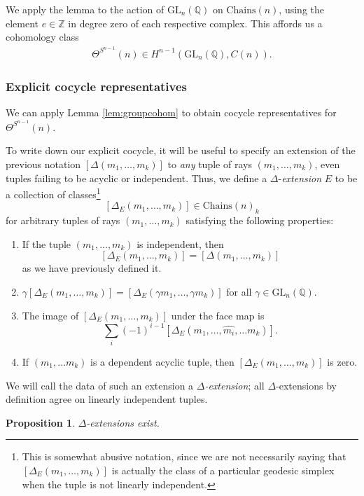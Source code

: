 \documentclass[10pt]{amsart}
\newtheorem{prop}[thm]{Proposition}
\theoremstyle{definition}
\newcommand{\Chains}{\mathrm{Chains}}
\numberwithin{equation}{section}
\begin{document}
    We apply the lemma to the action of $\mathrm{GL}_n(\mathbb{Q})$ on $\Chains(n)$, using the element $e\in \mathbb{Z}$ in degree zero of each respective complex. This affords us a cohomology class
    \begin{align}
    \Theta^{S^{n-1}}(n)\in H^{n-1}(\mathrm{GL}_n(\mathbb{Q}), C(n)).
    \end{align}
    
    \subsubsection{Explicit cocycle representatives}

    We can apply Lemma \ref{lem:groupcohom} to obtain cocycle representatives for $\Theta^{S^{n-1}}(n)$.
    
    To write down our explicit cocycle, it will be useful to specify an extension of the previous notation $[\Delta(m_1,\ldots, m_k)]$ to \emph{any} tuple of rays $(m_1,\ldots, m_k)$, even tuples failing to be acyclic or independent. Thus, we define a $\Delta$-\emph{extension} $E$ to be a collection of classes\footnote{This is somewhat abusive notation, since we are not necessarily saying that $[\Delta_E(m_1,\ldots, m_k)]$ is actually the class of a particular geodesic simplex when the tuple is not linearly independent.}
    \[
        [\Delta_E(m_1,\ldots, m_k)] \in \Chains(n)_k
    \]
    for arbitrary tuples of rays $(m_1,\ldots, m_k)$ satisfying the following properties:
    \begin{enumerate}
        \item If the tuple $(m_1,\ldots, m_k)$ is independent, then 
        \[
        [\Delta_E(m_1,\ldots, m_k)]=[\Delta(m_1,\ldots, m_k)]
        \]
        as we have previously defined it.
        \item $\gamma [\Delta_E(m_1,\ldots, m_k)]= [\Delta_E(\gamma m_1,\ldots, \gamma m_k)]$ for all $\gamma\in \mathrm{GL}_n(\mathbb{Q})$.
        \item The image of $[\Delta_E(m_1,\ldots, m_k)]$ under the face map is 
        \[
        \sum_i (-1)^{i-1} [\Delta_E(m_1,\ldots,\hat{m_i},\ldots m_k)].
        \]
        \item If $(m_1,\ldots m_k)$ is a dependent acyclic tuple, then $[\Delta_E(m_1,\ldots, m_k)]$ is zero.
    \end{enumerate}
    We will call the data of such an extension a \emph{$\Delta$-extension}; all $\Delta$-extensions by definition agree on linearly independent tuples.
    \begin{prop} \label{prop:degen}
        $\Delta$-extensions exist.    
    \end{prop}
\end{document}
